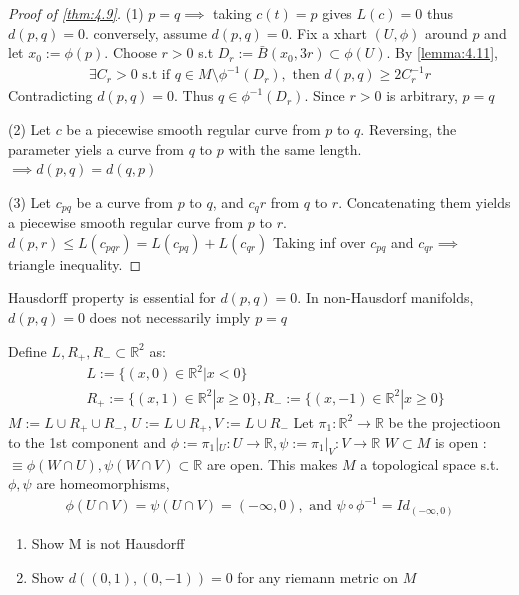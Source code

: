 \begin{proof}[Proof of \autoref{thm:4.9}]
    (1) $p=q \implies$ taking $c(t) = p$ gives $L(c) = 0 $ thus $d(p,q) =0$.
    conversely, assume $d(p,q) = 0$.
    Fix a xhart $(U, \phi)$ around $p$ and let $x_0 := \phi(p)$. 
    Choose $r>0$ s.t $D_r := \bar{B}(x_0, 3r) \subset \phi(U)$. By \autoref{lemma:4.11}, 
    \[
    \begin{aligned}
        \exists C_r > 0 \text{ s.t if } q \in M \setminus \phi^{-1} (D_r), \text{ then } d(p,q) \geq 2C_r^{-1} r
    \end{aligned}
    \]
    Contradicting $d(p,q) = 0$. Thus $q \in \phi^{-1}(D_r)$.
    Since $r>0$ is arbitrary, $p=q$

    (2) Let $c$ be a piecewise smooth regular curve from $p$ to $q$. Reversing, the parameter yiels a curve from $q$ to $p$ with the same length. $\implies d(p,q) = d(q,p)$

    (3) Let $c_{pq}$ be a curve from $p$ to $q$, and $c_qr$ from $q$ to $r$. Concatenating them yields a piecewise smooth regular curve from $p$ to $r$.
    $d(p,r) \leq L(c_{pqr}) = L(c_{pq}) + L(c_{qr})$ Taking inf over $c_{pq}$ and $c_{qr} \implies$ triangle inequality. 
\end{proof}

\begin{remark}
    Hausdorff property is essential for $d(p,q) = 0$. In non-Hausdorf manifolds, $d(p,q)=0$ does not necessarily imply $p=q$
\end{remark}

\begin{problem}
    Define $L, R_+, R_- \subset \mathbb{R}^2$ as:
    \[
    \begin{aligned}
        &L:= \{(x, 0) \in \mathbb{R}^2 | x<0\}\\
        &R_+ := \{(x, 1) \in \mathbb{R}^2 | x \geq 0\}, R_- := \{(x, -1) \in \mathbb{R}^2 | x \geq 0\}
    \end{aligned}
    \]
    $M:=L \cup R_+ \cup R_-$, $U:= L \cup R_+, V:= L \cup R_-$
    Let $\pi_1 : \mathbb{R}^2 \to \mathbb{R}$ be the projectioon to the 1st component
    and $\phi := \pi_1 |_U : U \to \mathbb{R}, \psi := \pi_1 |_V : V \to \mathbb{R}$
    $W \subset M$ is open : $\equiv \phi(W \cap U), \psi(W \cap  V)\subset \mathbb{R}$ are open.
    This makes $M$ a topological space s.t. $\phi, \psi$ are homeomorphisms,
    \[
    \begin{aligned}
        \phi(U \cap V) = \psi(U\cap V) = (-\infty, 0), \text{ and } \psi \circ \phi^{-1} = Id_{(-\infty, 0)}
    \end{aligned}
    \]
    \begin{enumerate}
        \item Show M is not Hausdorff
        \item Show $d \left((0,1), (0,-1)\right) = 0$ for any riemann metric on $M$
    \end{enumerate}
\end{problem}

